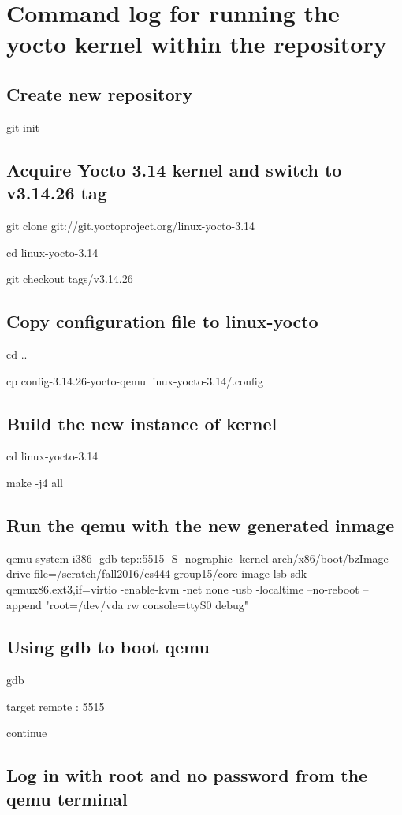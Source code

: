 \documentclass[letterpaper,10pt]{article}
\begin{document}
\section{Command log for running the yocto kernel within the repository}
\subsection{Create new repository}
git init
\subsection{Acquire Yocto 3.14 kernel and switch to v3.14.26 tag}
git clone git://git.yoctoproject.org/linux-yocto-3.14

cd linux-yocto-3.14

git checkout tags/v3.14.26
\subsection{Copy configuration file to linux-yocto}
cd ..

cp config-3.14.26-yocto-qemu linux-yocto-3.14/.config
\subsection{Build the new instance of kernel}
cd linux-yocto-3.14

make -j4 all

\subsection{Run the qemu with the new generated inmage}
qemu-system-i386 -gdb tcp::5515 -S -nographic -kernel arch/x86/boot/bzImage -drive file=/scratch/fall2016/cs444-group15/core-image-lsb-sdk-qemux86.ext3,if=virtio -enable-kvm -net none -usb -localtime --no-reboot --append "root=/dev/vda rw console=ttyS0 debug"
\subsection{Using gdb to boot qemu}
gdb

target remote : 5515

continue
\subsection{Log in with root and no password from the qemu terminal}
\end{document}
